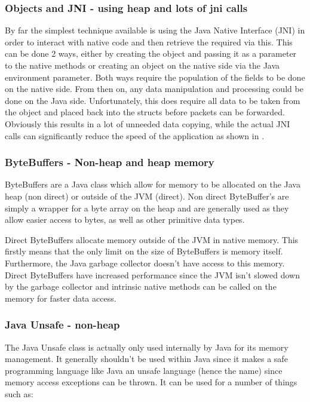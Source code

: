 \documentclass[final_report.tex]{subfiles}
\begin{document}
\subsubsection{Objects and JNI - using heap and lots of jni calls}
By far the simplest technique available is using the Java Native Interface (JNI) in order to interact with native code and then retrieve the required via this. This can be done 2 ways, either by creating the object and passing it as a parameter to the native methods or creating an object on the native side via the Java environment parameter. Both ways require the population of the fields to be done on the native side. From then on, any data manipulation and processing could be done on the Java side. Unfortunately, this does require all data to be taken from the object and placed back into the structs before packets can be forwarded. Obviously this results in a lot of unneeded data copying, while the actual JNI calls can significantly reduce the speed of the application as shown in .

\subsubsection{ByteBuffers - Non-heap and heap memory}
ByteBuffers are a Java class which allow for memory to be allocated on the Java heap (non direct) or outside of the JVM (direct). Non direct ByteBuffer's are simply a wrapper for a byte array on the heap and are generally used as they allow easier access to bytes, as well as other primitive data types.

Direct ByteBuffers allocate memory outside of the JVM in native memory. This firstly means that the only limit on the size of ByteBuffers is memory itself. Furthermore, the Java garbage collector doesn't have access to this memory. Direct ByteBuffers have increased performance since the JVM isn't slowed down by the garbage collector and intrinsic native methods can be called on the memory for faster data access.

\subsubsection{Java Unsafe - non-heap}
The Java Unsafe class is actually only used internally by Java for its memory management. It generally shouldn't be used within Java since it makes a safe programming language like Java an unsafe language (hence the name) since memory access exceptions can be thrown. It can be used for a number of things such as:
\end{document}
